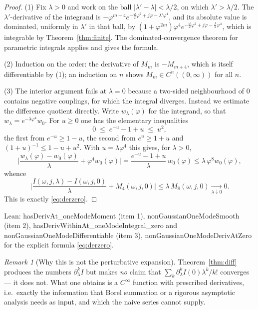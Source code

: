 \documentclass[11pt,a4paper]{article}
\theoremstyle{plain}
\theoremstyle{definition}
\theoremstyle{remark}
\newtheorem{remark}[theorem]{Remark}
\let\leanoldunderscore\_
\newcommand{\leanbreakunderscore}{\leanoldunderscore\allowbreak}
\newcommand{\lean}[1]{{\ttfamily\hyphenchar\font=-1\relax
  \let\_\leanbreakunderscore #1}}
\begin{document}
\begin{proof}
(1) Fix $\lambda>0$ and work on the ball $|\lambda'-\lambda|<\lambda/2$, on which
$\lambda'>\lambda/2$. The $\lambda'$-derivative of the integrand is
$-\varphi^{m+4}e^{-\frac{\omega}{2}\varphi^{2}+j\varphi-\lambda'\varphi^{4}}$, and its
absolute value is dominated, uniformly in $\lambda'$ in that ball, by
$(1+\varphi^{2m})\varphi^{4}e^{-\frac{\omega}{2}\varphi^{2}+j\varphi-\frac{\lambda}{2}\varphi^{4}}$,
which is integrable by Theorem~\ref{thm:finite}. The dominated-convergence theorem for
parametric integrals applies and gives the formula.

(2) Induction on the order: the derivative of $M_m$ is $-M_{m+4}$, which is itself
differentiable by (1); an induction on $n$ shows $M_m\in C^{n}((0,\infty))$ for all $n$.

(3) The interior argument fails at $\lambda=0$ because a two-sided neighbourhood of $0$
contains negative couplings, for which the integral diverges. Instead we estimate the
difference quotient directly. Write $w_\lambda(\varphi)$ for the integrand, so that
$w_\lambda=e^{-\lambda\varphi^{4}}w_0$. For $u\ge0$ one has the elementary inequalities
\[
0\;\le\;e^{-u}-1+u\;\le\;u^{2},
\]
the first from $e^{-u}\ge 1-u$, the second from $e^{u}\ge 1+u$ and
$(1+u)^{-1}\le 1-u+u^{2}$. With $u=\lambda\varphi^{4}$ this gives, for $\lambda>0$,
\[
\Big|\frac{w_\lambda(\varphi)-w_0(\varphi)}{\lambda}+\varphi^{4}w_0(\varphi)\Big|
=\frac{e^{-u}-1+u}{\lambda}\,w_0(\varphi)
\le \lambda\,\varphi^{8}w_0(\varphi),
\]
whence
\[
\Big|\frac{I(\omega,j,\lambda)-I(\omega,j,0)}{\lambda}+M_4(\omega,j,0)\Big|
\le \lambda\,M_8(\omega,j,0)\xrightarrow[\lambda\downarrow0]{}0 .
\]
This is exactly \eqref{eq:derzero}.
\end{proof}

Lean: \lean{hasDerivAt\_oneModeMoment} (item 1),
\lean{nonGaussianOneModeSmooth} (item 2),
\lean{hasDerivWithinAt\_oneModeIntegral\_zero} and
\lean{nonGaussianOneModeDifferentiable} (item 3),
\lean{nonGaussianOneModeDerivAtZero} for the explicit formula \eqref{eq:derzero}.

\begin{remark}[Why this is not the perturbative expansion]
Theorem~\ref{thm:diff} produces the numbers $\partial_\lambda^{k}I$ but makes \emph{no}
claim that $\sum_k \partial_\lambda^{k}I(0)\lambda^{k}/k!$ converges --- it does not.
What one obtains is a $C^{\infty}$ function with prescribed derivatives, i.e.\ exactly the
information that Borel summation or a rigorous asymptotic analysis needs as input, and
which the naive series cannot supply.
\end{remark}
\end{document}
